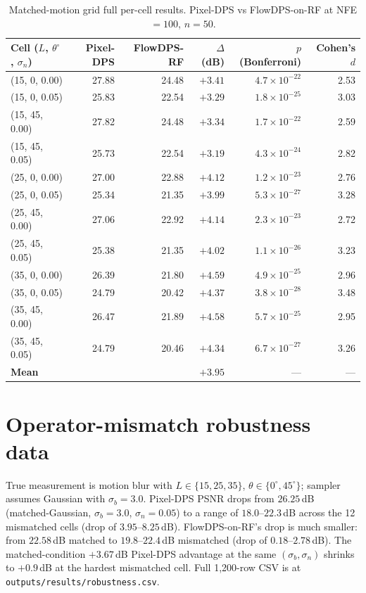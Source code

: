 \documentclass{article}
\begin{document}
\begin{table}[h]
  \centering
  \caption{Matched-motion grid full per-cell results. Pixel-DPS vs
    FlowDPS-on-RF at NFE${=}100$, $n{=}50$.}
  \label{tab:matched_motion_full}
  \begin{tabular}{lrrrrr}
    \toprule
    Cell ($L$, $\theta^\circ$, $\sigma_n$) & Pixel-DPS & FlowDPS-RF & $\Delta$ (dB) & $p$ (Bonferroni) & Cohen's $d$ \\
    \midrule
    (15, 0, 0.00)  & 27.88 & 24.48 & $+3.41$ & $4.7\times10^{-22}$ & 2.53 \\
    (15, 0, 0.05)  & 25.83 & 22.54 & $+3.29$ & $1.8\times10^{-25}$ & 3.03 \\
    (15, 45, 0.00) & 27.82 & 24.48 & $+3.34$ & $1.7\times10^{-22}$ & 2.59 \\
    (15, 45, 0.05) & 25.73 & 22.54 & $+3.19$ & $4.3\times10^{-24}$ & 2.82 \\
    (25, 0, 0.00)  & 27.00 & 22.88 & $+4.12$ & $1.2\times10^{-23}$ & 2.76 \\
    (25, 0, 0.05)  & 25.34 & 21.35 & $+3.99$ & $5.3\times10^{-27}$ & 3.28 \\
    (25, 45, 0.00) & 27.06 & 22.92 & $+4.14$ & $2.3\times10^{-23}$ & 2.72 \\
    (25, 45, 0.05) & 25.38 & 21.35 & $+4.02$ & $1.1\times10^{-26}$ & 3.23 \\
    (35, 0, 0.00)  & 26.39 & 21.80 & $+4.59$ & $4.9\times10^{-25}$ & 2.96 \\
    (35, 0, 0.05)  & 24.79 & 20.42 & $+4.37$ & $3.8\times10^{-28}$ & 3.48 \\
    (35, 45, 0.00) & 26.47 & 21.89 & $+4.58$ & $5.7\times10^{-25}$ & 2.95 \\
    (35, 45, 0.05) & 24.79 & 20.46 & $+4.34$ & $6.7\times10^{-27}$ & 3.26 \\
    \midrule
    \textbf{Mean}  &       &       & $\boldsymbol{+3.95}$ & --- & --- \\
    \bottomrule
  \end{tabular}
\end{table}

\section{Operator-mismatch robustness data}
\label{app:robustness}

True measurement is motion blur with $L \in \{15, 25, 35\}$,
$\theta \in \{0^\circ, 45^\circ\}$; sampler assumes Gaussian with
$\sigma_b{=}3.0$. Pixel-DPS PSNR drops from $26.25$\,dB
(matched-Gaussian, $\sigma_b{=}3.0$, $\sigma_n{=}0.05$) to a
range of $18.0$--$22.3$\,dB across the 12 mismatched cells (drop of
$3.95$--$8.25$\,dB). FlowDPS-on-RF's drop is much smaller:
from $22.58$\,dB matched to $19.8$--$22.4$\,dB mismatched
(drop of $0.18$--$2.78$\,dB). The matched-condition $+3.67$\,dB
Pixel-DPS advantage at the same $(\sigma_b, \sigma_n)$ shrinks to
$+0.9$\,dB at the hardest mismatched cell. Full 1,200-row CSV
is at \texttt{outputs/results/robustness.csv}.
\end{document}
